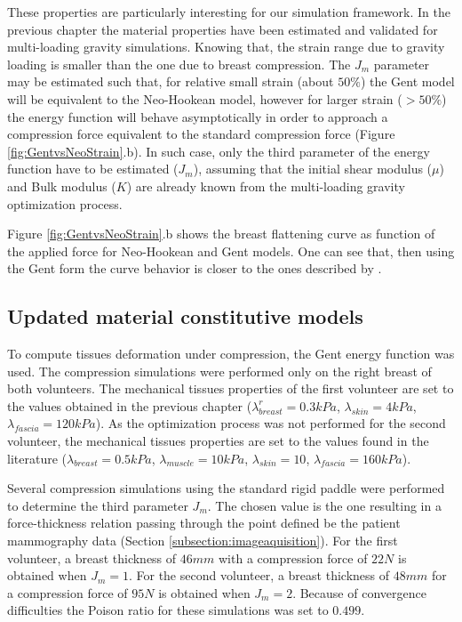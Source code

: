 These properties are particularly interesting for our simulation framework. In the previous chapter the material properties have been estimated and validated for multi-loading gravity simulations. Knowing that, the strain range due to gravity loading is smaller than the one due to breast compression. The $J_m$ parameter may be estimated such that, for relative small strain (about $50\%$) the Gent model will be equivalent to the Neo-Hookean model, however for larger strain ($> 50\%$) the energy function will behave asymptotically in order to approach a compression force equivalent to the standard compression force (Figure \ref{fig:GentvsNeoStrain}.b). In such case, only the third parameter of the energy function have to be estimated ($J_m$), assuming that the initial shear modulus ($\mu$) and Bulk modulus ($K$) are already known from the multi-loading gravity optimization process.

Figure \ref{fig:GentvsNeoStrain}.b shows the breast flattening curve as function of the applied force for Neo-Hookean and Gent models. One can see that, then using the Gent form the curve behavior is closer to the ones described by \cite{de_pain_2015}.

\subsection{Updated material constitutive models}

To compute tissues deformation under compression, the Gent energy function was used. The compression simulations were performed only on the right breast of both volunteers. The mechanical tissues properties of the first volunteer are set to the values obtained in the previous chapter ($\lambda_{breast}^r=0.3 kPa$, $\lambda_{skin}=4 kPa$, $\lambda_{fascia}=120 kPa$). As the optimization process was not performed for the second volunteer, the mechanical tissues properties are set to the values found in the literature ($\lambda_{breast}=0.5 kPa$, $\lambda_{muscle}= 10kPa$, $\lambda_{skin}=10$, $\lambda_{fascia}= 160kPa$).  

Several compression simulations using the standard rigid paddle were performed to determine the third parameter $J_m$. The chosen value is the one resulting in a force-thickness relation passing through the point defined be the patient mammography data (Section \ref{subsection:imageaquisition}). For the first volunteer, a breast thickness of $46mm$ with a compression force of $22N$ is obtained when  $J_m = 1$. For the second volunteer, a breast thickness of $48mm$ for a compression force of $95N$ is obtained when $J_m = 2$. Because of convergence difficulties the Poison ratio for these simulations was set to $0.499$.

